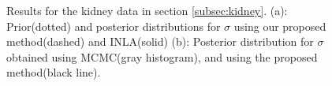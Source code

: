 \documentclass[ba]{imsart}
\begin{document}
\begin{figure}[ht]
\centering
{}
\caption{Results for the kidney data in section \ref{subsec:kidney}. (a): Prior(dotted) and posterior distributions for $\sigma$ using our proposed method(dashed) and INLA(solid) (b): Posterior distribution for $\sigma$ obtained using MCMC(gray histogram), and using the proposed method(black line).}
\label{fig:kidneyHyper}
\end{figure}
\end{document}
